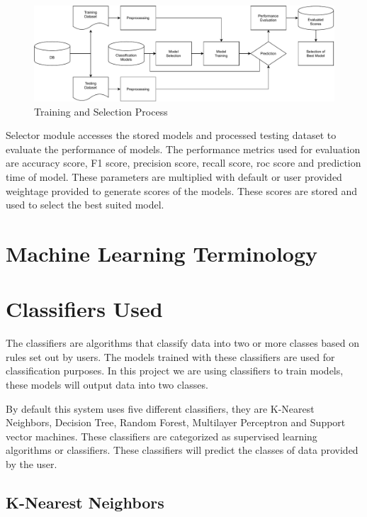 \begin{figure}[H]
  \centering
  \includegraphics[width=0.9\columnwidth]{media/architecture/Process.pdf}
  \caption{Training and Selection Process}
  \label{fig:training_and_selection_process}
\end{figure}

Selector module accesses the stored models and processed testing dataset to evaluate the performance of models. The performance metrics used for evaluation are accuracy score, F1 score, precision score, recall score, roc score and prediction time of model. These parameters are multiplied with default or user provided weightage provided to generate scores of the models. These scores are stored and used to select the best suited model.

\section{Machine Learning Terminology} \label{sec:machine_learning_terminology}


\section{Classifiers Used} \label{sec:supervised_learning}

The classifiers are algorithms that classify data into two or more classes based on rules set out by users. The models trained with these classifiers are used for classification purposes. In this project we are using classifiers to train models, these models will output data into two classes.

By default this system uses five different classifiers, they are K-Nearest Neighbors, Decision Tree, Random Forest, Multilayer Perceptron and Support vector machines. These classifiers are categorized as supervised learning algorithms or classifiers. These classifiers will predict the classes of data provided by the user.

\subsection{K-Nearest Neighbors} \label{subsec:K_nearest_neighbors}

